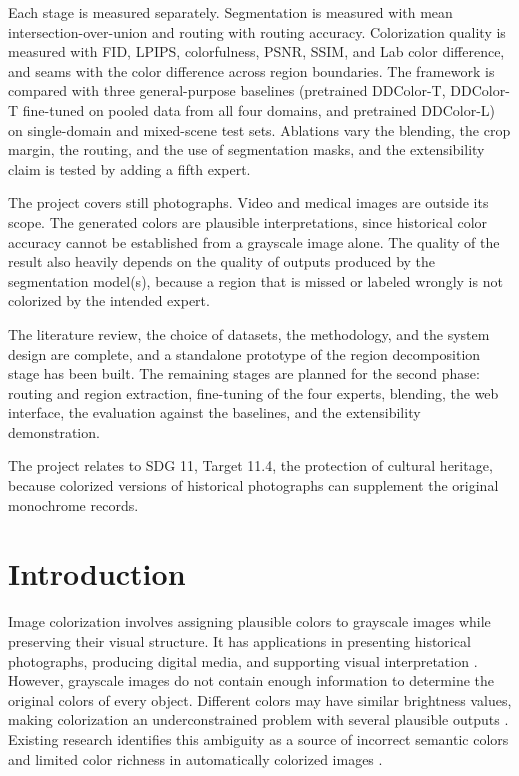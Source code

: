 \documentclass{FastFyp}
\begin{document}
Each stage is measured separately. Segmentation is measured with mean intersection-over-union and routing with routing accuracy. Colorization quality is measured with FID, LPIPS, colorfulness, PSNR, SSIM, and Lab color difference, and seams with the color difference across region boundaries. The framework is compared with three general-purpose baselines (pretrained DDColor-T, DDColor-T fine-tuned on pooled data from all four domains, and pretrained DDColor-L) on single-domain and mixed-scene test sets. Ablations vary the blending, the crop margin, the routing, and the use of segmentation masks, and the extensibility claim is tested by adding a fifth expert.

The project covers still photographs. Video and medical images are outside its scope. The generated colors are plausible interpretations, since historical color accuracy cannot be established from a grayscale image alone. The quality of the result also heavily depends on the quality of outputs produced by the segmentation model(s), because a region that is missed or labeled wrongly is not colorized by the intended expert.

The literature review, the choice of datasets, the methodology, and the system design are complete, and a standalone prototype of the region decomposition stage has been built. The remaining stages are planned for the second phase: routing and region extraction, fine-tuning of the four experts, blending, the web interface, the evaluation against the baselines, and the extensibility demonstration.

The project relates to SDG 11, Target 11.4, the protection of cultural heritage, because colorized versions of historical photographs can supplement the original monochrome records.
\pagebreak


\pagestyle{fancy} %
\tableofcontents

\pagebreak
\listoffigures	%
\pagebreak
\listoftables %

\mainmatter


\chapter{Introduction}
Image colorization involves assigning plausible colors to grayscale images while preserving their visual structure. It has applications in presenting historical photographs, producing digital media, and supporting visual interpretation \cite{ref21}. However, grayscale images do not contain enough information to determine the original colors of every object. Different colors may have similar brightness values, making colorization an underconstrained problem with several plausible outputs \cite{ref1,ref11}. Existing research identifies this ambiguity as a source of incorrect semantic colors and limited color richness in automatically colorized images \cite{ref1,ref9}.
\end{document}

